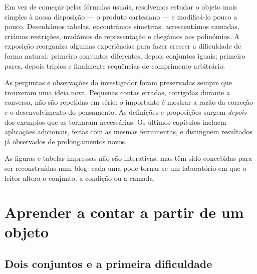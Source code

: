 \documentclass[11pt,a4paper,oneside]{book}
\begin{document}
Em vez de começar pelas fórmulas usuais, resolvemos estudar o objeto mais simples à nossa disposição --- o produto cartesiano --- e modificá-lo pouco a pouco. Desenhámos tabelas, encontrámos simetrias, acrescentámos camadas, criámos restrições, mudámos de representação e chegámos aos polinómios. A exposição reorganiza algumas experiências para fazer crescer a dificuldade de forma natural: primeiro conjuntos diferentes, depois conjuntos iguais; primeiro pares, depois triplos e finalmente sequências de comprimento arbitrário.

As perguntas e observações do investigador foram preservadas sempre que trouxeram uma ideia nova. Pequenas contas erradas, corrigidas durante a conversa, não são repetidas em série: o importante é mostrar a razão da correção e o desenvolvimento do pensamento. As definições e proposições surgem \emph{depois} dos exemplos que as tornaram necessárias. Os últimos capítulos incluem aplicações adicionais, feitas com as mesmas ferramentas, e distinguem resultados já observados de prolongamentos novos.

As figuras e tabelas impressas não são interativas, mas têm sido concebidas para ser reconstruídas num blog: cada uma pode tornar-se um laboratório em que o leitor altera o conjunto, a condição ou a camada.
\tableofcontents
\mainmatter

\part{Aprender a contar a partir de um objeto}
\chapter{Dois conjuntos e a primeira dificuldade}
\end{document}
